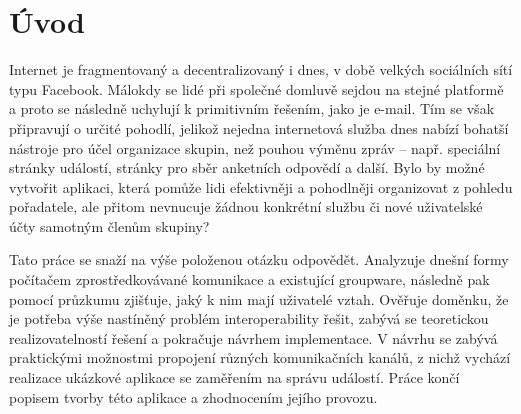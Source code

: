 \documentclass[12pt,oneside,final]{fithesis2}
\begin{document}
\FrontMatter
\ThesisTitlePage



\begin{ThesisDeclaration}
\DeclarationText
\AdvisorName
\end{ThesisDeclaration}












\tableofcontents



\MainMatter






\chapter{Úvod}\label{introduction}
Internet je fragmentovaný a decentralizovaný i dnes, v době velkých sociálních sítí typu Facebook. Málokdy se lidé při společné domluvě sejdou na stejné platformě a proto se následně uchylují k primitivním řešením, jako je e-mail. Tím se však připravují o určité pohodlí, jelikož nejedna internetová služba dnes nabízí bohatší nástroje pro účel organizace skupin, než pouhou výměnu zpráv -- např. speciální stránky událostí, stránky pro sběr anketních odpovědí a další. Bylo by možné vytvořit aplikaci, která pomůže lidi efektivněji a pohodlněji organizovat z pohledu pořadatele, ale přitom nevnucuje žádnou konkrétní službu či nové uživatelské účty samotným členům skupiny?

Tato práce se snaží na výše položenou otázku odpovědět. Analyzuje dnešní formy počítačem zprostředkovávané komunikace a existující groupware, následně pak pomocí průzkumu zjišťuje, jaký k nim mají uživatelé vztah. Ověřuje doměnku, že je potřeba výše nastíněný problém interoperability řešit, zabývá se teoretickou realizovatelností řešení a pokračuje návrhem implementace. V návrhu se zabývá praktickými možnostmi propojení různých komunikačních kanálů, z nichž vychází realizace ukázkové aplikace se zaměřením na správu událostí. Práce končí popisem tvorby této aplikace a zhodnocením jejího provozu.
\end{document}
